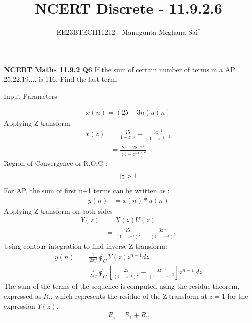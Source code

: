 \documentclass[journal,12pt,twocolumn]{IEEEtran}
\theoremstyle{remark}
\begin{document}

\vspace{3cm}

\title{NCERT Discrete - 11.9.2.6}
\author{EE23BTECH11212 - Manugunta Meghana Sai$^{*}$%
}
\maketitle
\newpage
\bigskip

\renewcommand{\thefigure}{\theenumi}
\renewcommand{\thetable}{\theenumi}

\vspace{3cm}
\textbf{NCERT Maths 11.9.2 Q6} 
If the sum of certain number of terms in a AP 25,22,19,... is 116. Find the last term.\\
\solution
\begin{table}[h!]
    \centering
    
    \caption{Input Parameters}
    \label{tab:table1}
\end{table}
\begin{align}
	x(n) = (25 - 3n)u(n)
	\label{eq:11.9.2.6}
\end{align}
Applying Z transform:
\begin{align}
    x(z) &=\frac{25}{1-z^{-1}} - \frac{3z^{-1}}{(1-z^{-1})^2}\\
    &= \frac{25-28z^{-1}}{(1-z^{-1})^2} 
\end{align}
     Region of Convergence or R.O.C :
\begin{align}
     \left\vert z\right\vert>1
\end{align}
For AP, the sum of first n+1 terms can be written as :
\begin{align}
	 y(n)&=x(n)*u(n)
\end{align}  
Applying Z transform on both sides
\begin{align}
	Y(z) &= X(z)U(z)\\
	&=\frac{25}{(1-z^{-1})^2} - \frac{3z^{-1}}{(1-z^{-1})^3}
\end{align}
Using contour integration to find inverse Z transform:
\begin{align}
	y(n) &= \frac{1}{2\pi j} \oint_C Y(z) z^{n-1} dz\\
	&= \frac{1}{2\pi j} \oint_C \left[ \frac{25}{(1-z^{-1})^2} - \frac{3z^{-1}}{(1-z^{-1})^3} \right]z^{n-1} \, dz
\end{align}
The sum of the terms of the sequence is computed using the residue theorem, expressed as $R_i$, which represents the residue of the Z-transform at $ z=1 $ for the expression $ Y(z) $.
\begin{align}
	R_i=R_1 + R_2
\end{align}
\end{document}
